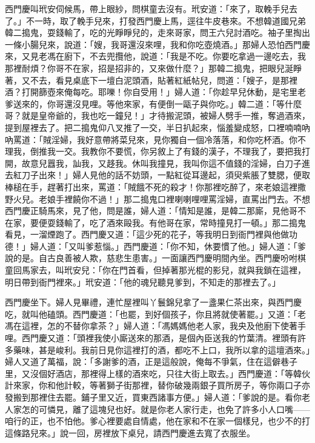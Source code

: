 西門慶叫玳安伺候馬，帶上眼紗，問棋童去沒有。玳安道：「來了，取輓手兒去了。」不一時，取了輓手兒來，打發西門慶上馬，逕往牛皮巷來。不想韓道國兄弟韓二搗鬼，耍錢輸了，吃的光睜睜兒的，走來哥家，問王六兒討酒吃。袖子里掏出一條小腸兒來，說道：「嫂，我哥還沒來哩，我和你吃壺燒酒。」那婦人恐怕西門慶來，又見老馮在廚下，不去兜攬他，說道：「我是不吃。你要吃拿過一邊吃去，我那裡耐煩？你哥不在家，招是招非的，又來做什麼？」那韓二搗鬼，把眼兒涎睜著，又不去，看見桌底下一壇白泥頭酒，貼著紅紙帖兒，問道：「嫂子，是那裡酒？打開篩壺來俺每吃。耶嚛！你自受用！」婦人道：「你趁早兒休動，是宅里老爹送來的，你哥還沒見哩。等他來家，有便倒一甌子與你吃。」韓二道：「等什麼哥？就是皇帝爺的，我也吃一鐘兒！」才待搬泥頭，被婦人劈手一推，奪過酒來，提到屋裡去了。把二搗鬼仰八叉推了一交，半日扒起來，惱羞變成怒，口裡喃喃吶吶罵道：「賊淫婦，我好意帶將菜兒來，見你獨自一個冷落落，和你吃杯酒。你不理我，倒推我一交。我教你不要慌，你另敘上了有錢的漢子，不理我了，要把我打開，故意兒囂我，訕我，又趍我。休叫我撞見，我叫你這不值錢的淫婦，白刀子進去紅刀子出來！」婦人見他的話不妨頭，一點紅從耳邊起，須臾紫脹了雙腮，便取棒槌在手，趕著打出來，罵道：「賊餓不死的殺才！你那裡吃醉了，來老娘這裡撒野火兒。老娘手裡饒你不過！」那二搗鬼口裡喇喇哩哩罵淫婦，直罵出門去。不想西門慶正騎馬來，見了他，問是誰，婦人道：「情知是誰，是韓二那廝，見他哥不在家，要便耍錢輸了，吃了酒來毆我。有他哥在家，常時撞見打一頓。」那二搗鬼看見，一溜煙跑了。西門慶又道：「這少死的花子，等我明日到衙門裡與他做功德！」婦人道：「又叫爹惹惱。」西門慶道：「你不知，休要慣了他。」婦人道：「爹說的是。自古良善被人欺，慈悲生患害。」一面讓西門慶明間內坐。西門慶吩咐棋童回馬家去，叫玳安兒：「你在門首看，但掉著那光棍的影兒，就與我鎖在這裡，明日帶到衙門裡來。」玳安道：「他的魂兒聽見爹到，不知走的那裡去了。」

西門慶坐下。婦人見畢禮，連忙屋裡叫丫鬟錦兒拿了一盞果仁茶出來，與西門慶吃，就叫他磕頭。西門慶道：「也罷，到好個孩子，你且將就使著罷。」又道：「老馮在這裡，怎的不替你拿茶？」婦人道：「馮媽媽他老人家，我央及他廚下使著手哩。西門慶又道：「頭裡我使小廝送來的那酒，是個內臣送我的竹葉清。裡頭有許多藥味，甚是峻利。我前日見你這裡打的酒，都吃不上口，我所以拿的這壇酒來。」婦人又道了萬福，說：「多謝爹的酒，正是這般說，俺每不爭氣，住在這僻巷子里，又沒個好酒店，那裡得上樣的酒來吃，只往大街上取去。」西門慶道：「等韓伙計來家，你和他計較，等著獅子街那裡，替你破幾兩銀子買所房子，等你兩口子亦發搬到那裡住去罷。鋪子里又近，買東西諸事方便。」婦人道：「爹說的是。看你老人家怎的可憐見，離了這塊兒也好。就是你老人家行走，也免了許多小人口嘴——咱行的正，也不怕他。爹心裡要處自情處，他在家和不在家一個樣兒，也少不的打這條路兒來。」說一回，房裡放下桌兒，請西門慶進去寬了衣服坐。

